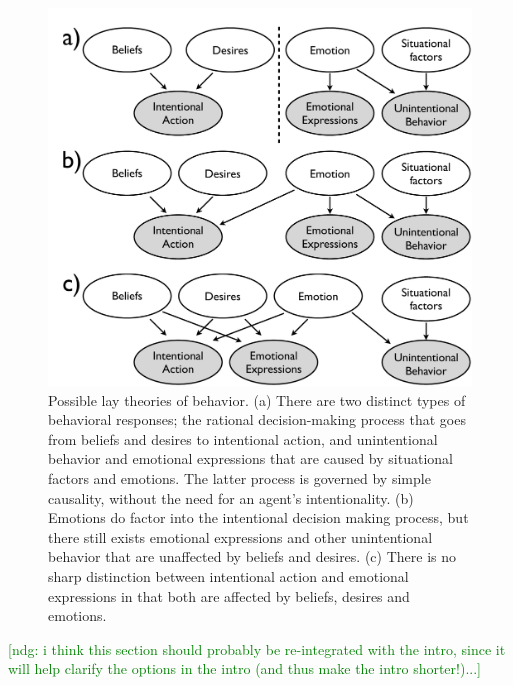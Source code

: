 \documentclass[10pt,letterpaper]{article}
\newcommand{\ndg}[1]{\textcolor{Green}{[ndg: #1]}}
\begin{document}
\begin{figure}[htb!]
\begin{center}
\includegraphics[width=1\columnwidth]{images/model1.pdf} 
\end{center}
\caption{ Possible lay theories of behavior. (a) There are two distinct types of behavioral responses; the rational decision-making process that goes from beliefs and desires to intentional action, and unintentional behavior and emotional expressions that are caused by situational factors and emotions. The latter process is governed by simple causality, without the need for an agent's intentionality. (b) Emotions do factor into the intentional decision making process, but there still exists emotional expressions and other unintentional behavior that are unaffected by beliefs and desires. (c) There is no sharp distinction between intentional action and emotional expressions in that both are affected by beliefs, desires and emotions.  }
\label{ModelsOfBehaviorFig}
\end{figure}


\ndg{i think this section should probably be re-integrated with the intro, since it will help clarify the options in the intro (and thus make the intro shorter!)...}
\end{document}

